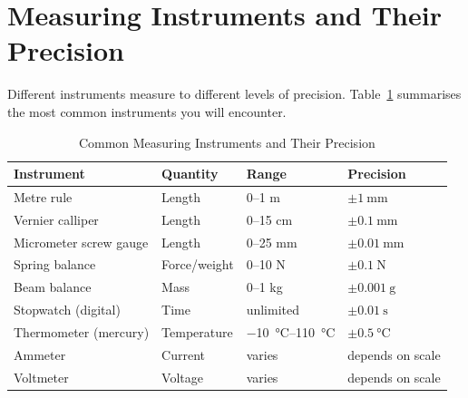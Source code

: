 \section{Measuring Instruments and Their Precision}
\label{sec:instruments}

Different instruments measure to different levels of
precision. Table~\ref{tab:instruments} summarises the
most common instruments you will encounter.

\begin{table}[H]
\centering
\caption{Common Measuring Instruments and Their Precision}
\label{tab:instruments}
\begin{tabular}{llll}
\toprule
\textbf{Instrument} & \textbf{Quantity} &
\textbf{Range} & \textbf{Precision}\\
\midrule
Metre rule          & Length    & 0--1 m       & $\pm 1\ \text{mm}$\\
Vernier calliper    & Length    & 0--15 cm     & $\pm 0.1\ \text{mm}$\\
Micrometer screw gauge & Length & 0--25 mm   & $\pm 0.01\ \text{mm}$\\
Spring balance      & Force/weight & 0--10 N  & $\pm 0.1\ \text{N}$\\
Beam balance        & Mass      & 0--1 kg      & $\pm 0.001\ \text{g}$\\
Stopwatch (digital) & Time      & unlimited    & $\pm 0.01\ \text{s}$\\
Thermometer (mercury)& Temperature & \SIrange{-10}{110}{\degreeCelsius} & $\pm\SI{0.5}{\degreeCelsius}$\\
Ammeter             & Current   & varies       & depends on scale\\
Voltmeter           & Voltage   & varies       & depends on scale\\
\bottomrule
\end{tabular}
\end{table}

